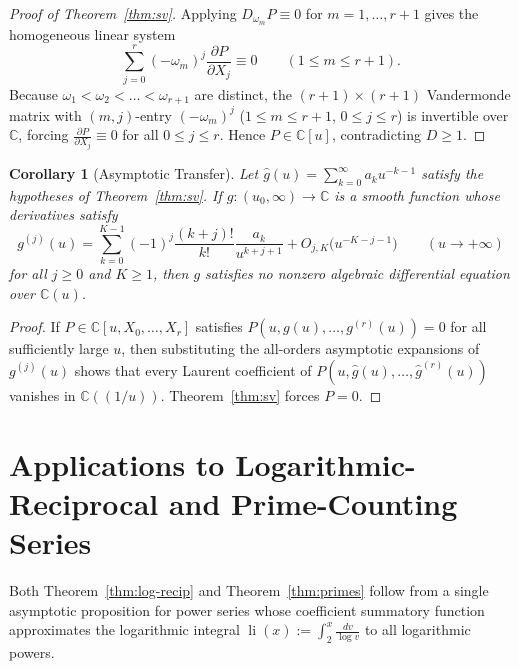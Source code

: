 \documentclass[10pt,reqno]{amsart}
\numberwithin{equation}{section}
\newtheorem{corollary}[proposition]{Corollary}
\theoremstyle{definition}
\newcommand{\C}{\mathbb{C}}
\DeclareMathOperator{\li}{li}
\begin{document}
\begin{proof}[Proof of Theorem~\ref{thm:sv}]
Applying $D_{\omega_m} P \equiv 0$ for $m = 1, \dots, r + 1$ gives the homogeneous linear system
\[
  \sum_{j=0}^r (-\omega_m)^j \frac{\partial P}{\partial X_j} \equiv 0 \qquad (1 \le m \le r + 1).
\]
Because $\omega_1 < \omega_2 < \dots < \omega_{r+1}$ are distinct, the $(r+1)\times(r+1)$ Vandermonde matrix with $(m, j)$-entry $(-\omega_m)^j$ ($1 \le m \le r+1$, $0 \le j \le r$) is invertible over $\C$, forcing $\frac{\partial P}{\partial X_j} \equiv 0$ for all $0 \le j \le r$. Hence $P \in \C[u]$, contradicting $D \ge 1$.
\end{proof}

\begin{corollary}[Asymptotic Transfer]\label{cor:asymp-transfer}
Let $\widehat{g}(u) = \sum_{k=0}^\infty a_k u^{-k-1}$ satisfy the hypotheses of Theorem~\ref{thm:sv}. If $g : (u_0, \infty) \to \C$ is a smooth function whose derivatives satisfy
\[
  g^{(j)}(u) = \sum_{k=0}^{K-1} (-1)^j \frac{(k+j)!}{k!} \frac{a_k}{u^{k+j+1}} + O_{j,K}\bigl(u^{-K-j-1}\bigr)
  \qquad (u \to +\infty)
\]
for all $j \ge 0$ and $K \ge 1$, then $g$ satisfies no nonzero algebraic differential equation over $\C(u)$.
\end{corollary}

\begin{proof}
If $P \in \C[u, X_0, \dots, X_r]$ satisfies $P(u, g(u), \dots, g^{(r)}(u)) = 0$ for all sufficiently large $u$, then substituting the all-orders asymptotic expansions of $g^{(j)}(u)$ shows that every Laurent coefficient of $P(u, \widehat{g}(u), \dots, \widehat{g}^{(r)}(u))$ vanishes in $\C((1/u))$. Theorem~\ref{thm:sv} forces $P = 0$.
\end{proof}

\section{Applications to Logarithmic-Reciprocal and Prime-Counting Series}\label{sec:apps}

Both Theorem~\ref{thm:log-recip} and Theorem~\ref{thm:primes} follow from a single asymptotic proposition for power series whose coefficient summatory function approximates the logarithmic integral $\li(x) := \int_2^x \frac{dv}{\log v}$ to all logarithmic powers.
\end{document}
